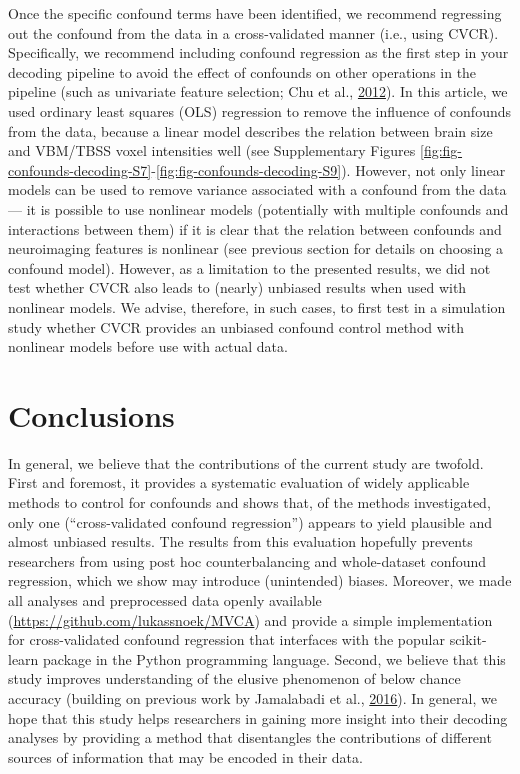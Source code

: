 \documentclass[11pt,american,]{memoir} %
\begin{document}
Once the specific confound terms have been identified, we recommend regressing out the confound from the data in a cross-validated manner (i.e., using CVCR). Specifically, we recommend including confound regression as the first step in your decoding pipeline to avoid the effect of confounds on other operations in the pipeline (such as univariate feature selection; Chu et al., \protect\hyperlink{ref-chu2012does}{2012}). In this article, we used ordinary least squares (OLS) regression to remove the influence of confounds from the data, because a linear model describes the relation between brain size and VBM/TBSS voxel intensities well (see Supplementary Figures \ref{fig:fig-confounds-decoding-S7}-\ref{fig:fig-confounds-decoding-S9}). However, not only linear models can be used to remove variance associated with a confound from the data --- it is possible to use nonlinear models (potentially with multiple confounds and interactions between them) if it is clear that the relation between confounds and neuroimaging features is nonlinear (see previous section for details on choosing a confound model). However, as a limitation to the presented results, we did not test whether CVCR also leads to (nearly) unbiased results when used with nonlinear models. We advise, therefore, in such cases, to first test in a simulation study whether CVCR provides an unbiased confound control method with nonlinear models before use with actual data.

\hypertarget{conclusions}{%
\section{Conclusions}\label{conclusions}}

In general, we believe that the contributions of the current study are twofold. First and foremost, it provides a systematic evaluation of widely applicable methods to control for confounds and shows that, of the methods investigated, only one (``cross-validated confound regression'') appears to yield plausible and almost unbiased results. The results from this evaluation hopefully prevents researchers from using post hoc counterbalancing and whole-dataset confound regression, which we show may introduce (unintended) biases. Moreover, we made all analyses and preprocessed data openly available (\url{https://github.com/lukassnoek/MVCA}) and provide a simple implementation for cross-validated confound regression that interfaces with the popular scikit-learn package in the Python programming language. Second, we believe that this study improves understanding of the elusive phenomenon of below chance accuracy (building on previous work by Jamalabadi et al., \protect\hyperlink{ref-jamalabadi2016classification}{2016}). In general, we hope that this study helps researchers in gaining more insight into their decoding analyses by providing a method that disentangles the contributions of different sources of information that may be encoded in their data.
\end{document}
